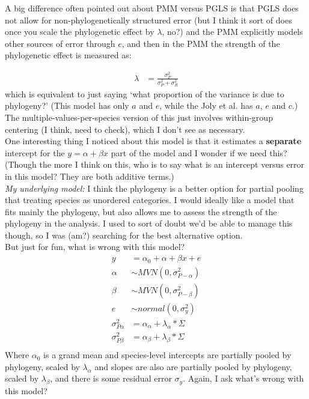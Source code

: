 \documentclass[11pt,letter]{article}
\begin{document}
A big difference often pointed out about PMM versus PGLS is that PGLS does not allow for non-phylogenetically structured error (but I think it sort of does once you scale the phylogenetic effect by $\lambda$, no?) and the PMM explicitly models other sources of error through $e$, and then in the PMM the strength of the phylogenetic effect is measured as:

\begin{align}
\lambda & = \frac{\sigma^2_P}{\sigma^2_P+\sigma^2_R}
\end{align}
which is equivalent to just saying `what proportion of the variance is due to phylogeny?' (This model has only $a$ and $e$, while the Joly et al. has $a$, $e$ and $c$.)\\

The multiple-values-per-species version of this just involves within-group centering (I think, need to check), which I don't see as necessary. \\

One interesting thing I noticed about this model is that it estimates a {\bf separate} intercept for the $y = \alpha + \beta x$ part of the model and I wonder if we need this? (Though the more I think on this, who is to say what is an intercept versus error in this model? They are both additive terms.) \\

\emph{My underlying model:} I think the phylogeny is a better option for partial pooling that treating species as unordered categories. I would ideally like a model that fits mainly the phylogeny, but also allows me to assess the strength of the phylogeny in the analysis. I used to sort of doubt we'd be able to manage this though, so I was (am?) searching for the best alternative option. \\

But just for fun, what is wrong with this model?\\

\begin{align}
y & = \alpha_0 + \alpha + \beta x + e\\
\alpha & \sim MVN(0, \sigma_{P-\alpha}^2)\\
\beta & \sim MVN(0, \sigma_{P-\beta}^2)\\
e & \sim normal(0, \sigma_y^2)\\
\sigma_{P\alpha}^2 & = \alpha_{\alpha} + \lambda_\alpha*\Sigma\\
\sigma_{P\beta}^2 & = \alpha_{\beta} + \lambda_\beta*\Sigma\\
\end{align}
Where $\alpha_0 $ is a grand mean and species-level intercepts are partially pooled by phylogeny, scaled by $\lambda_\alpha$ and slopes are also are partially pooled by phylogeny, scaled by $\lambda_\beta$, and there is some residual error $\sigma_y$. Again, I ask what's wrong with this model?\\
\end{document}
